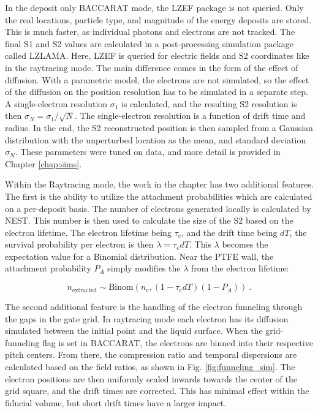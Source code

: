 In the deposit only BACCARAT mode, the LZEF package is not queried.
Only the real locations, particle type, and magnitude of the energy deposits are stored.
This is much faster, as individual photons and electrons are not tracked.
The final S1 and S2 values are calculated in a post-processing simulation package called LZLAMA.
Here, LZEF is queried for electric fields and S2 coordinates like in the raytracing mode.
The main difference comes in the form of the effect of diffusion.
With a parametric model, the electrons are not simulated, so the effect of the diffusion on the position resolution has to be simulated in a separate step.
A single-electron resolution $\sigma_1$ is calculated, and the resulting S2 resolution is then $\sigma_N= \sigma_1/\sqrt{N}$. 
The single-electron resolution is a function of drift time and radius.
In the end, the S2 reconstructed position is then sampled from a Gaussian distribution with the unperturbed location as the mean, and standard deviation $\sigma_N$.
These parameters were tuned on data, and more detail is provided in Chapter \ref{chap:sims}.

Within the Raytracing mode, the work in the chapter has two additional features.
The first is the ability to utilize the attachment probabilities which are calculated on a per-deposit basis.
The number of electrons generated locally is calculated by NEST.
This number is then used to calculate the size of the S2 based on the electron lifetime.
The electron lifetime being $\tau_e$, and the drift time being $dT$, the survival probability per electron is then $\lambda = \tau_e dT$.
This $\lambda$ becomes the expectation value for a Binomial distribution.
Near the PTFE wall, the attachment probability $P_A$ simply modifies the $\lambda$ from the electron lifetime:

\begin{equation}
    n_{\text{extracted}} \sim \text{Binom}(n_{e}, (1-\tau_e dT)(1-P_A) )~.
\end{equation}

The second additional feature is the handling of the electron funneling through the gaps in the gate grid.
In raytracing mode each electron has its diffusion simulated between the initial point and the liquid surface. 
When the grid-funneling flag is set in BACCARAT, the  electrons are binned into their respective pitch centers.
From there, the compression ratio and temporal dispersions are calculated based on the field ratios, as shown in Fig.  \ref{fig:funneling_sim}.
The electron positions are then uniformly scaled inwards towards the center of the grid square, and the drift times are corrected.
This has minimal effect within the fiducial volume, but short drift times have a larger impact.

